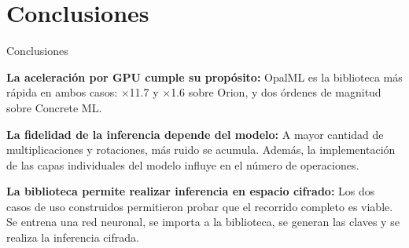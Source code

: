 \section{Conclusiones}

\begin{frame}{Conclusiones}
    \begin{listaalineada}
        \setlength{\itemsep}{12pt}
        \item \textbf{La aceleración por GPU cumple su propósito:} OpalML es la biblioteca más rápida en ambos casos: $\times$11.7 y $\times$1.6 sobre Orion, y dos órdenes de magnitud sobre Concrete ML.
        \item \textbf{La fidelidad de la inferencia depende del modelo:} A mayor cantidad de multiplicaciones y rotaciones, más ruido se acumula. Además, la implementación de las capas individuales del modelo influye en el número de operaciones.
        \item \textbf{La biblioteca permite realizar inferencia en espacio cifrado:} Los dos casos de uso construidos permitieron probar que el recorrido completo es viable. Se entrena una red neuronal, se importa a la biblioteca, se generan las claves y se realiza la inferencia cifrada.
    \end{listaalineada}
    \begingroup
    \let\thefootnote\relax
    \endgroup
\end{frame}

